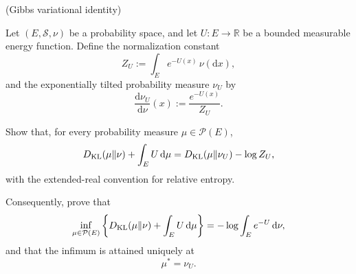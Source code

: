 \documentclass[12pt,a4paper,oneside]{book}
\begin{document}
\begin{Question}
(Gibbs variational identity)

Let $(E,\mathcal S,\nu)$ be a probability space, and let
$U:E\to\mathbb R$ be a bounded measurable energy function.
Define the normalization constant
\begin{equation*}
    Z_U:=\int_E e^{-U(x)}\,\nu(\mathrm dx),
\end{equation*}
and the exponentially tilted probability measure $\nu_U$ by
\begin{equation*}
    \frac{\mathrm d\nu_U}{\mathrm d\nu}(x)
    :=\frac{e^{-U(x)}}{Z_U}.
\end{equation*}

Show that, for every probability measure
$\mu\in\mathcal P(E)$,
\begin{equation*}
    D_{\mathrm{KL}}(\mu\Vert\nu)+\int_E U\,\mathrm d\mu
    =
    D_{\mathrm{KL}}(\mu\Vert\nu_U)-\log Z_U,
\end{equation*}
with the extended-real convention for relative entropy.

Consequently, prove that
\begin{equation*}
    \inf_{\mu\in\mathcal P(E)}
    \left\{
        D_{\mathrm{KL}}(\mu\Vert\nu)+\int_E U\,\mathrm d\mu
    \right\}
    =
    -\log\int_E e^{-U}\,\mathrm d\nu,
\end{equation*}
and that the infimum is attained uniquely at
\begin{equation*}
    \mu^*=\nu_U.
\end{equation*}
\end{Question}
\end{document}
